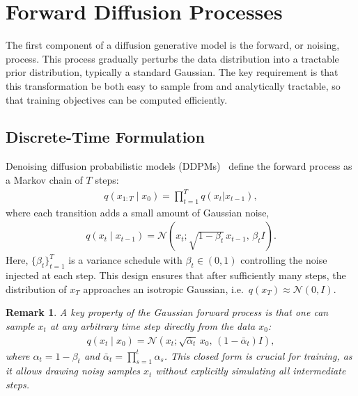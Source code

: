 \documentclass[12pt]{report}
\newtheorem{remark}{Remark}[section]
\begin{document}
\section{Forward Diffusion Processes}
The first component of a diffusion generative model is the forward, or noising, process. 
This process gradually perturbs the data distribution into a tractable prior distribution, typically a standard Gaussian. The key requirement is that this transformation be both easy to sample from and analytically tractable, so that training objectives can be computed efficiently. 

\subsection{Discrete-Time Formulation}
Denoising diffusion probabilistic models (DDPMs)~\cite{hoDenoisingDiffusionProbabilistic2020} define the forward process as a Markov chain of \(T\) steps:
\begin{align*}
    q\left(x_{1:T}\mid x_0\right)=\prod_{t=1}^{T}q\left(x_t|x_{t-1}\right),
\end{align*}
where each transition adds a small amount of Gaussian noise,
\begin{align*}
    q\left(x_t \mid x_{t-1}\right) = \mathcal{N}\!\left(x_t ; \sqrt{1-\beta_t}\,x_{t-1}, \, \beta_t I \right).
\end{align*}
Here, \(\{\beta_t\}_{t=1}^T\) is a variance schedule with \(\beta_t \in (0,1)\) controlling the noise injected at each step. 
This design ensures that after sufficiently many steps, the distribution of \(x_T\) approaches an isotropic Gaussian, i.e.~\(q(x_T) \approx \mathcal{N}(0,I)\).
\begin{remark}
    A key property of the Gaussian forward process is that one can sample $x_t$ at any arbitrary time step directly from the data \(x_0\):
    \begin{align*}
        q\left(x_t \mid x_0\right) = \mathcal{N}\!\left(x_t ; \sqrt{\bar \alpha_t}\,x_0, \,(1-\bar \alpha_t) I \right),
    \end{align*}
    where $\alpha_t = 1 - \beta_t$ and $\bar \alpha_t = \prod_{s=1}^t \alpha_s$. This closed form is crucial for training, as it allows drawing noisy samples \(x_t\) without explicitly simulating all intermediate steps.
\end{remark}
\end{document}
